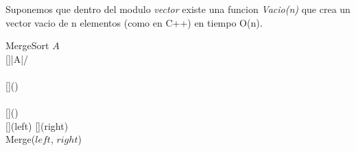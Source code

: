 \documentclass[10pt, a4paper]{article}
\begin{document}
{\grisOpcional{\nln\nln\hrule\nln\nln}}
 \label{aclaracionVacio} Suponemos que dentro del modulo \textit{vector} existe una funcion \textit{Vacio(n)} que crea un vector vacio de n elementos (como en C++) en tiempo O(n). 

\begin{implementacion}%
    {MergeSort}%
    {}{\Vector}{}%
        \State \Return $A$%
    \EndIf%
    \\%
    [\nat]{|A|\;/}  %
    \\%
    \\ \comentario{$left = A[0\;\dots\;mid)$}
    [\Vector]{\Vacio()} %
    \EndFor%
    \\%
    \\ \comentario{$right = A[mid\;\dots\;|A|)$}
    [\Vector]{\Vacio()} %
    \EndFor%
    \\%
    [\Vector]{\MergeSort(left)} %
    [\Vector]{\MergeSort(right)} %
    \\%
    \State \Return Merge($left$, $right$) %
    \\
\end{implementacion}

\clearpage
\end{document}
